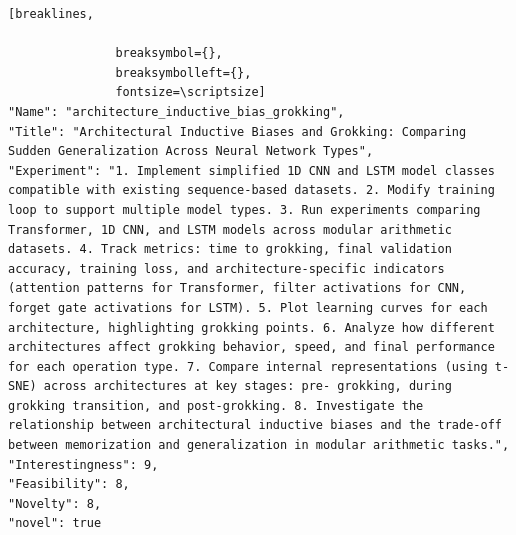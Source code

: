 \begin{tcolorbox}[
  breakable,
  colback  = blue!5!white,
  colframe = blue!75!black,
  title    = {Idea 48/50 - \texttt{architecture\_inductive\_bias\_grokking}},
  fontupper=\scriptsize\ttfamily,
]
\begin{Verbatim}[breaklines,

               breaksymbol={},
               breaksymbolleft={},
               fontsize=\scriptsize]
"Name": "architecture_inductive_bias_grokking",
"Title": "Architectural Inductive Biases and Grokking: Comparing Sudden Generalization Across Neural Network Types",
"Experiment": "1. Implement simplified 1D CNN and LSTM model classes compatible with existing sequence-based datasets. 2. Modify training loop to support multiple model types. 3. Run experiments comparing Transformer, 1D CNN, and LSTM models across modular arithmetic datasets. 4. Track metrics: time to grokking, final validation accuracy, training loss, and architecture-specific indicators (attention patterns for Transformer, filter activations for CNN, forget gate activations for LSTM). 5. Plot learning curves for each architecture, highlighting grokking points. 6. Analyze how different architectures affect grokking behavior, speed, and final performance for each operation type. 7. Compare internal representations (using t-SNE) across architectures at key stages: pre- grokking, during grokking transition, and post-grokking. 8. Investigate the relationship between architectural inductive biases and the trade-off between memorization and generalization in modular arithmetic tasks.",
"Interestingness": 9,
"Feasibility": 8,
"Novelty": 8,
"novel": true
\end{Verbatim}
\end{tcolorbox}

